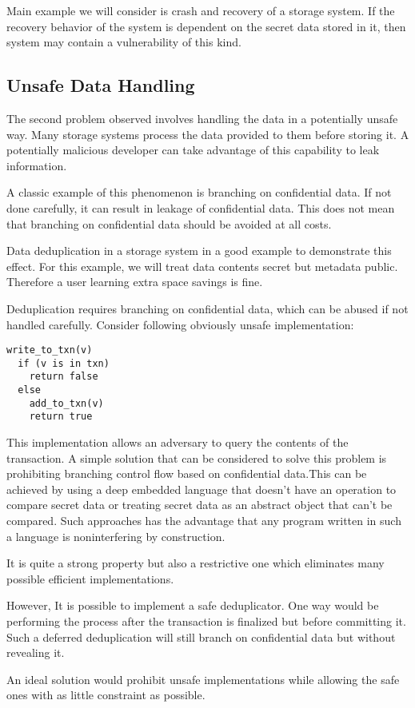 Main example we will consider is crash and recovery of a storage system. If the recovery behavior of the system is dependent on the secret data stored in it, then system may contain a vulnerability of this kind. 

\subsection{Unsafe Data Handling}
The second problem observed involves handling the data in a potentially unsafe way. Many storage systems process the data provided to them before storing it. A potentially malicious developer can take advantage of this capability to leak information.

A classic example of this phenomenon is branching on confidential data. If not done carefully, it can result in leakage of confidential data. This does not mean that branching on confidential data should be avoided at all costs.

Data deduplication in a storage system in a good example to demonstrate this effect. For this example, we will treat data contents secret but metadata public. Therefore a user learning extra space savings is fine.

Deduplication requires branching on confidential data, which can be abused if not handled carefully. Consider following obviously unsafe implementation:

\begin{lstlisting}
write_to_txn(v)
  if (v is in txn)
    return false
  else
    add_to_txn(v)
    return true
\end{lstlisting}

This implementation allows an adversary to query the contents of the transaction. 
A simple solution that can be considered to solve this problem is prohibiting branching control flow based on confidential data.This can be achieved by using a deep embedded language that doesn't have an operation to compare secret data or treating secret data as an abstract object that can't be compared. Such approaches has the advantage 
that any program written in such a language is noninterfering by construction. 

It is quite a strong property but also a restrictive one which eliminates many possible efficient implementations.

However, It is possible to implement a safe deduplicator. One way would be performing the process after the transaction is finalized but before committing it. Such a deferred deduplication will still branch on confidential data but without revealing it.

An ideal solution would prohibit unsafe implementations while allowing the safe ones with as little constraint as possible.  
